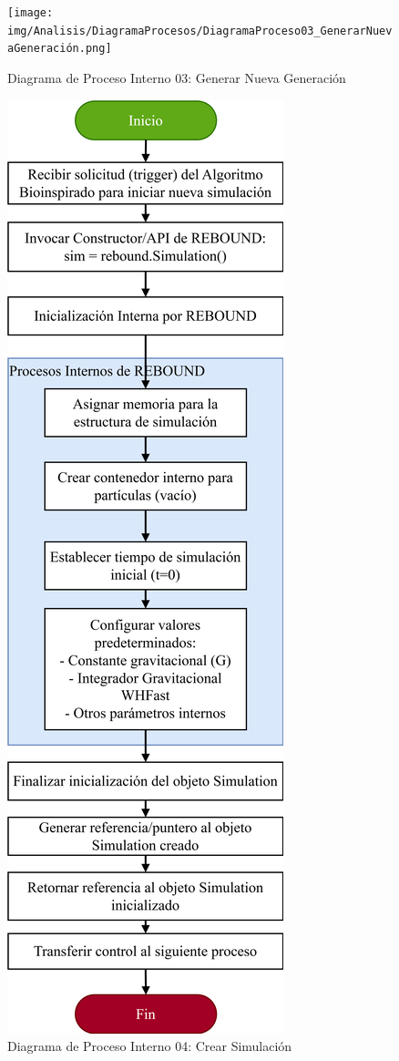 \begin{figure}[H]
    \centering
    \texttt{[image: img/Analisis/DiagramaProcesos/DiagramaProceso03\_GenerarNuevaGeneración.png]}
    \caption{Diagrama de Proceso Interno 03: Generar Nueva Generación}%
    \label{fig:process_diagram03}
\end{figure}

\begin{figure}[H]
    \centering
    \includegraphics[width=\textwidth]{img/Analisis/DiagramaProcesos/DiagramaProceso04_CrearSimulacion.png}
    \caption{Diagrama de Proceso Interno 04: Crear Simulación}%
    \label{fig:process_diagram04}
\end{figure}

